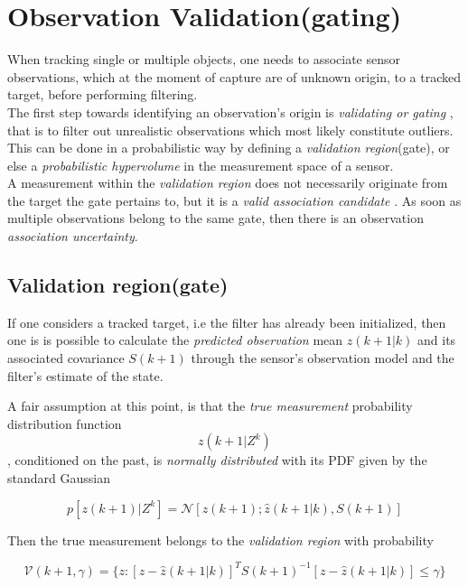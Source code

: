 \section{Observation Validation(gating)}


When tracking single or multiple objects, one needs to associate sensor observations, which at the moment of capture are of unknown origin, to a tracked target, before performing filtering.\\


The first step towards identifying an observation's origin is \emph{validating or gating} , that is to filter out unrealistic observations which most likely constitute outliers. This can be done in a probabilistic way by defining a \emph{validation region}(gate), or else a \emph{probabilistic hypervolume} in the measurement space of a sensor. \\


A measurement within the \emph{validation region}  does not necessarily originate from the target the gate pertains to, but it is a \emph{valid association candidate} . As soon as multiple observations belong to the same gate, then there is an observation \emph{association uncertainty}.

\subsection{Validation region(gate)}

If one considers a tracked target, i.e the filter has already been initialized, then one is is possible to calculate the \emph{predicted observation} mean $\hat{z}(k+1|k)$ and its associated covariance $S(k+1)$ through the sensor's observation model and the filter's estimate of the state.


A fair assumption at this point, is that the \emph{true measurement} probability distribution function $$ z(k+1| Z^k)$$, conditioned on the past, is \emph{normally distributed} with its PDF given by the standard Gaussian

$$
p[z(k+1)|Z^k] = \mathcal{N}[z(k+1); \hat{z}(k+1|k), S(k+1)]
$$



Then the true measurement belongs to the \emph{validation region} with probability


\begin{equation}\label{eq:gateEquation}
\mathcal{V}(k+1, \gamma) = \{z: [z-\hat{z}(k+1|k)]^T S(k+1)^{-1} [z-\hat{z}(k+1|k)] \leq \gamma \}
\end{equation}


